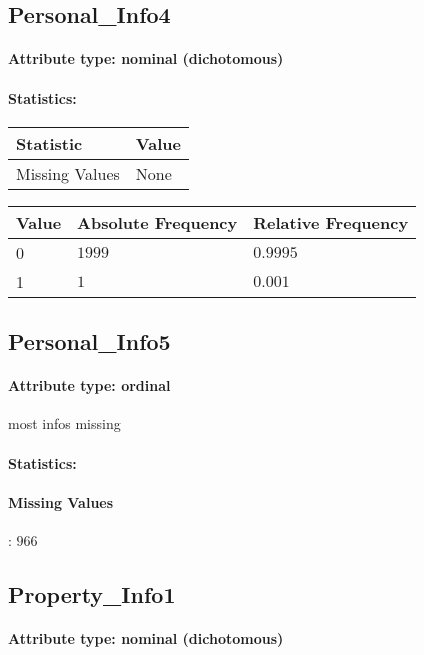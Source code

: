 \subsection{Personal\_Info4}
\paragraph{Attribute type: nominal (dichotomous)}
\paragraph{Statistics: }
\begin{table}[H]
	\renewcommand{\arraystretch}{1.25}
	\begin{tabular}{l|l}
		\textbf{Statistic} & \textbf{Value}\\\hline
		Missing Values& None\\\hline
	\end{tabular}
\end{table}
\begin{table}[H]
	\renewcommand{\arraystretch}{1.25}
	\begin{tabular}{l|l|l}
		\textbf{Value} & \textbf{Absolute Frequency} & \textbf{Relative Frequency}\\\hline
		0&$1999$&$0.9995$\\\hline
		1&$1$&$0.001$
	\end{tabular}
\end{table}

\subsection{Personal\_Info5}
\paragraph{Attribute type: ordinal} most infos missing
\paragraph{Statistics: }
\paragraph{Missing Values}: $966$

\subsection{Property\_Info1}
\paragraph{Attribute type: nominal (dichotomous)}
